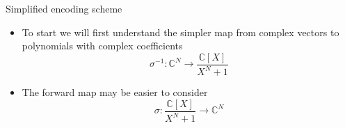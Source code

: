 \documentclass{beamer}
\begin{document}
\begin{frame}{Simplified encoding scheme}
	\begin{itemize}[<+->]
		\item To start we will first understand the simpler map from complex vectors to polynomials with complex
		coefficients 
		$$\sigma^{-1} : \mathbb{C}^N \to \frac{\mathbb{C}[X]}{X^N + 1}$$
		\item The forward map may be easier to consider
		$$\sigma: \frac{\mathbb{C}[X]}{X^N + 1} \to \mathbb{C}^N$$
	\end{itemize}
\end{frame}

\end{document}
